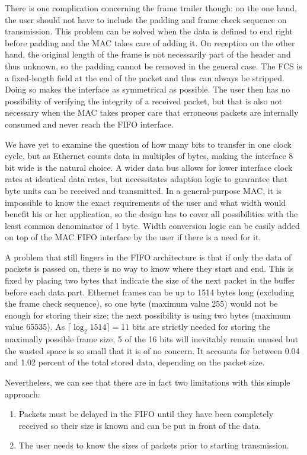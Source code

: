 \documentclass[a4paper, 11pt, oneside]{Thesis}  %
\begin{document}
There is one complication concerning the frame trailer though: on the one hand, the user should not have to include the padding and frame check sequence on transmission. This problem can be solved when the data is defined to end right before padding and the MAC takes care of adding it. On reception on the other hand, the original length of the frame is not necessarily part of the header and thus unknown, so the padding cannot be removed in the general case. The FCS is a fixed-length field at the end of the packet and thus can always be stripped. Doing so makes the interface as symmetrical as possible. The user then has no possibility of verifying the integrity of a received packet, but that is also not necessary when the MAC takes proper care that erroneous packets are internally consumed and never reach the FIFO interface.

We have yet to examine the question of how many bits to transfer in one clock cycle, but as Ethernet counts data in multiples of bytes, making the interface 8 bit wide is the natural choice. A wider data bus allows for lower interface clock rates at identical data rates, but necessitates adaption logic to guarantee that byte units can be received and transmitted. In a general-purpose MAC, it is impossible to know the exact requirements of the user and what width would benefit his or her application, so the design has to cover all possibilities with the least common denominator of 1 byte. Width conversion logic can be easily added on top of the MAC FIFO interface by the user if there is a need for it.

A problem that still lingers in the FIFO architecture is that if only the data of packets is passed on, there is no way to know where they start and end. This is fixed by placing two bytes that indicate the size of the next packet in the buffer before each data part. Ethernet frames can be up to 1514 bytes long (excluding the frame check sequence), so one byte (maximum value 255) would not be enough for storing their size; the next possibility is using two bytes (maximum value 65535). As $\lceil \log_2 1514 \rceil = 11$ bits are strictly needed for storing the maximally possible frame size, 5 of the 16 bits will inevitably remain unused but the wasted space is so small that it is of no concern. It accounts for between 0.04 and 1.02 percent of the total stored data, depending on the packet size.

Nevertheless, we can see that there are in fact two limitations with this simple approach:
\begin{enumerate}
\item Packets must be delayed in the FIFO until they have been completely received so their size is known and can be put in front of the data.
\item The user needs to know the sizes of packets prior to starting transmission. 
\end{enumerate}
\end{document}

